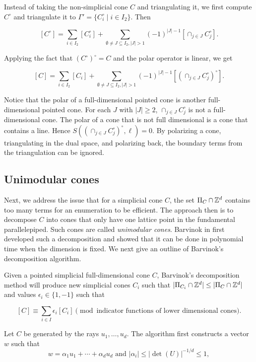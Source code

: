 Instead of taking the non-simplicial cone $C$ and triangulating it, we first compute $C^\circ$ and triangulate it to $\Gamma' = \{C_i^\circ \mid i \in I_2 \}$. Then

 \[ [C^\circ] = \sum_{i \in I_2} [C_i^\circ] + \sum_{\emptyset \neq J \subseteq I_2, |J| > 1} (-1)^{|J|-1} [\cap_{j \in J} C_j^\circ].\]
 
 Applying the fact that $(C^\circ)^\circ = C$ and the polar operator is linear, we get
 
  \[ [C] = \sum_{i \in I_2} [C_i] + \sum_{\emptyset \neq J \subseteq I_2, |J| > 1} (-1)^{|J|-1} [(\cap_{j \in J} C_j^\circ)^\circ].\]
  

Notice that the polar of a full-dimensional pointed cone is another full-dimensional pointed cone. For each $J$ with $|J| \geq 2$, $\cap_{j \in J} C_j^\circ$ is not a full-dimensional cone. The polar of a cone that is not full dimensional is a cone that contains a line. Hence $S((\cap_{j \in J} C_j^\circ)^\circ, \ell) = 0$. By polarizing a cone, triangulating in the dual space, and polarizing back, the boundary terms from the triangulation can be ignored. 

\subsection{Unimodular cones}
Next, we address the issue that for a simplicial cone $C$, the set $\Pi_C \cap {\mathbb Z}^d$ contains too many terms for an enumeration to be efficient. The approach then is to decompose $C$ into cones that only have one lattice point in the fundamental parallelepiped. Such cones are called \emph{unimodular cones}. Barvinok in \cite{bar} first developed such a decomposition and showed that it can be done in polynomial time when the dimension is fixed. We next give an outline of Barvinok's decomposition algorithm. 

Given a pointed simplicial full-dimensional cone $C$, Barvinok's decomposition method will produce new simplicial cones $C_i$ such that $|\Pi_{C_i} \cap {\mathbb Z}^d| \leq |\Pi_{C} \cap {\mathbb Z}^d|$ and values $\epsilon_i \in \{1, -1\}$ such that

\[ [C] \equiv \sum_{i \in I} \epsilon_i [C_i] \pmod{\text{indicator functions of lower dimensional cones}}.\]

Let $C$ be generated by the rays $u_1, \dots, u_d$. The algorithm first constructs a vector $w$ such that
 \[w = \alpha_1 u_1 + \cdots + \alpha_d u_d \text{ and } |\alpha_i| \leq |\det(U)|^{-1/d} \leq 1,\]
 
